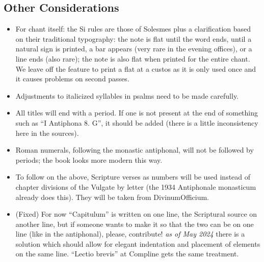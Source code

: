 \documentclass[11pt]{article}
\begin{document}
\subsection{Other Considerations}
\begin{itemize}
\item
For chant itself: the Si rules are those of Solesmes plus a clarification based on their traditional typography: the note is flat until the word ends, until a natural sign is printed, a bar appears (very rare in the evening offices), or a line ends (also rare); the note is also flat when printed for the entire chant. We leave off the feature to print a flat at a custos as it is only used once and it causes problems on second passes.
\item
Adjustments to italicized syllables in psalms need to be made carefully.
\item
All titles will end with a period. If one is not present at the end of something such as ``I Antiphona 8. G'', it should be added (there is a little inconsistency here in the sources).
\item
Roman numerals, following the monastic antiphonal, will not be followed by periods; the book looks more modern this way.
\item
To follow on the above, Scripture verses as numbers will be used instead of chapter divisions of the Vulgate by letter (the 1934 Antiphonale monasticum already does this). They will be taken from DivinumOfficium.
\item
(Fixed) For now ``Capitulum'' is written on one line, the Scriptural source on another line, but if someone wants to make it so that the two can be on one line (like in the antiphonal), please, contribute! \emph{as of May 2024} there is a solution which should allow for elegant indentation and placement of elements on the same line. ``Lectio brevis'' at Compline gets the same treatment.


\end{itemize}
\end{document}
